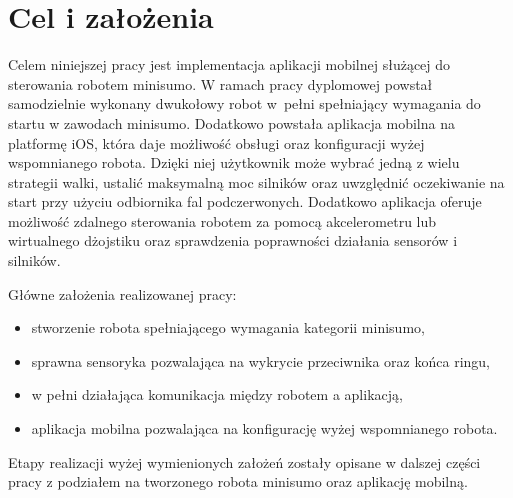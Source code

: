 \section{Cel i założenia}
Celem niniejszej pracy jest implementacja aplikacji mobilnej służącej do sterowania robotem minisumo. W ramach pracy dyplomowej powstał samodzielnie wykonany dwukołowy robot w~pełni spełniający wymagania do startu w zawodach minisumo. Dodatkowo powstała aplikacja mobilna na platformę iOS, która daje możliwość obsługi oraz konfiguracji wyżej wspomnianego robota. Dzięki niej użytkownik może wybrać jedną z wielu strategii walki, ustalić maksymalną moc silników oraz uwzględnić oczekiwanie na start przy użyciu odbiornika fal podczerwonych. Dodatkowo aplikacja oferuje możliwość zdalnego sterowania robotem za pomocą akcelerometru lub wirtualnego dżojstiku oraz sprawdzenia poprawności działania sensorów i silników. 

Główne założenia realizowanej pracy:
\begin{itemize}
\item stworzenie robota spełniającego wymagania kategorii minisumo,
\item sprawna sensoryka pozwalająca na wykrycie przeciwnika oraz końca ringu,
\item w pełni działająca komunikacja między robotem a aplikacją,
\item aplikacja mobilna pozwalająca na konfigurację wyżej wspomnianego robota.
\end{itemize}

Etapy realizacji wyżej wymienionych założeń zostały opisane w dalszej części pracy z podziałem na tworzonego robota minisumo oraz aplikację mobilną.
